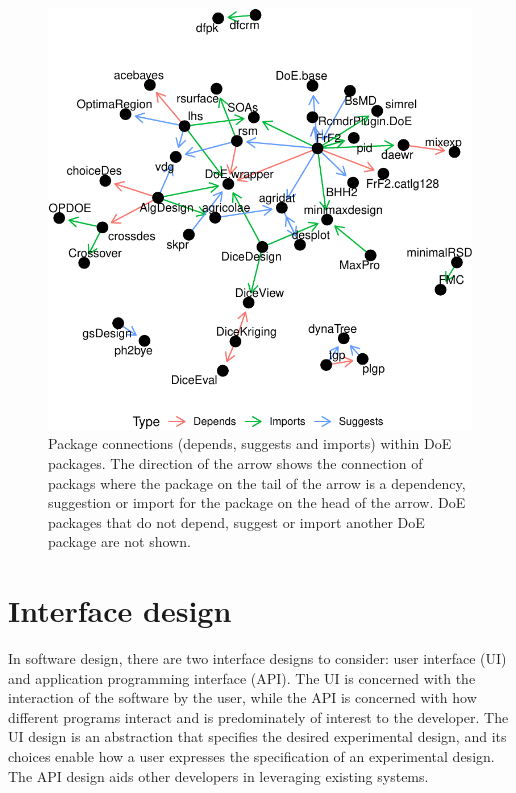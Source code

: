 \begin{figure}[htbp]

{\centering \includegraphics{figures/plot-doe-network-1} 

}

\caption{Package connections (depends, suggests and imports) within DoE packages. The direction of the arrow shows the connection of packags where the package on the tail of the arrow is a dependency, suggestion or import for the package on the head of the arrow.  DoE packages that do not depend, suggest or import another DoE package are not shown.}\label{fig:plot-doe-network}
\end{figure}

\hypertarget{design}{%
\section{Interface design}\label{design}}

In software design, there are two interface designs to consider: user interface (UI) and application programming interface (API). The UI is concerned with the interaction of the software by the user, while the API is concerned with how different programs interact and is predominately of interest to the developer. The UI design is an abstraction that specifies the desired experimental design, and its choices enable how a user expresses the specification of an experimental design. The API design aids other developers in leveraging existing systems.

